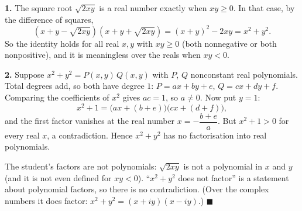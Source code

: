 \textbf{1.} The square root $\sqrt{2xy}$ is a real number exactly when $xy\ge0$. In that case, by the difference of squares,
\[
\left(x+y-\sqrt{2xy}\right)\left(x+y+\sqrt{2xy}\right)=(x+y)^2-2xy=x^2+y^2 .
\]
So the identity holds for all real $x,y$ with $xy\ge0$ (both nonnegative or both nonpositive), and it is meaningless over the reals when $xy<0$.

\textbf{2.} Suppose $x^2+y^2=P(x,y)\,Q(x,y)$ with $P$, $Q$ nonconstant real polynomials. Total degrees add, so both have degree $1$: $P=ax+by+e$, $Q=cx+dy+f$. Comparing the coefficients of $x^2$ gives $ac=1$, so $a\ne0$. Now put $y=1$:
\[
x^2+1=\bigl(ax+(b+e)\bigr)\bigl(cx+(d+f)\bigr),
\]
and the first factor vanishes at the real number $x=-\dfrac{b+e}{a}$. But $x^2+1>0$ for every real $x$, a contradiction. Hence $x^2+y^2$ has no factorisation into real polynomials.

The student's factors are not polynomials: $\sqrt{2xy}$ is not a polynomial in $x$ and $y$ (and it is not even defined for $xy<0$). ``$x^2+y^2$ does not factor'' is a statement about polynomial factors, so there is no contradiction. (Over the complex numbers it does factor: $x^2+y^2=(x+iy)(x-iy)$.) $\blacksquare$

